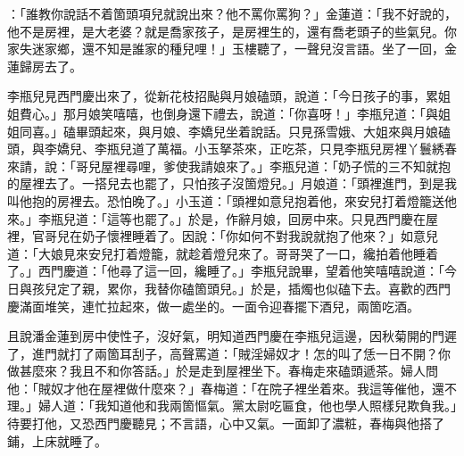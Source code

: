 ：「誰教你說話不着箇頭項兒就說出來？他不罵你罵狗？」金蓮道：「我不好說的，他不是房裡，是大老婆？就是喬家孩子，是房裡生的，還有喬老頭子的些氣兒。你家失迷家鄉，還不知是誰家的種兒哩！」玉樓聽了，一聲兒沒言語。坐了一回，金蓮歸房去了。

李瓶兒見西門慶出來了，從新花枝招颭與月娘磕頭，說道：「今日孩子的事，累姐姐費心。」{}那月娘笑嘻嘻，也倒身還下禮去，說道：「你喜呀！」李瓶兒道：「與姐姐同喜。」磕畢頭起來，與月娘、李嬌兒坐着說話。只見孫雪娥、大姐來與月娘磕頭，與李嬌兒、李瓶兒道了萬福。小玉拏茶來，正吃茶，只見李瓶兒房裡丫鬟綉春來請，說：「哥兒屋裡尋哩，爹使我請娘來了。」李瓶兒道：「奶子慌的三不知就抱的屋裡去了。一搭兒去也罷了，只怕孩子沒箇燈兒。」月娘道：「頭裡進門，到是我叫他抱的房裡去。恐怕晚了。」小玉道：「頭裡如意兒抱着他，來安兒打着燈籠送他來。」李瓶兒道：「這等也罷了。」於是，作辭月娘，回房中來。只見西門慶在屋裡，官哥兒在奶子懷裡睡着了。因說：「你如何不對我說就抱了他來？」如意兒道：「大娘見來安兒打着燈籠，就趁着燈兒來了。哥哥哭了一口，纔拍着他睡着了。」西門慶道：「他尋了這一回，纔睡了。」李瓶兒說畢，望着他笑嘻嘻說道：「今日與孩兒定了親，累你，我替你磕箇頭兒。」於是，插燭也似磕下去。喜歡的西門慶滿面堆笑，連忙拉起來，做一處坐的。一面令迎春擺下酒兒，兩箇吃酒。

且說潘金蓮到房中使性子，沒好氣，明知道西門慶在李瓶兒這邊，因秋菊開的門遲了，進門就打了兩箇耳刮子，高聲罵道：「賊淫婦奴才！怎的叫了恁一日不開？你做甚麼來？我且不和你答話。」於是走到屋裡坐下。春梅走來磕頭遞茶。婦人問他：「賊奴才他在屋裡做什麼來？」春梅道：「在院子裡坐着來。我這等催他，還不理。」婦人道：「我知道他和我兩箇慪氣。黨太尉吃匾食，他也學人照樣兒欺負我。」待要打他，又恐西門慶聽見；不言語，心中又氣。{}一面卸了濃粧，春梅與他搭了鋪，上床就睡了。

